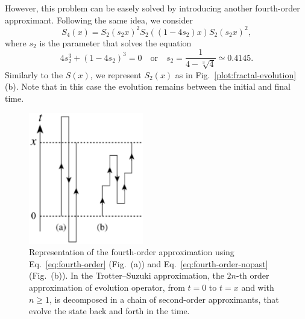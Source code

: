 However, this problem can be easely solved by introducing another fourth-order approximant. Following the same idea, we consider
\begin{equation} \label{eq:fourth-order-nopast}
S_4(x) = S_2(s_2x)^2 S_2((1-4s_2)x) S_2(s_2x)^2	,
\end{equation}
where $s_2$ is the parameter that solves the equation
\begin{equation}
4s_2^3 + (1-4s_2)^3 = 0 \quad \mathrm{or} \quad s_2 = \frac{1}{4 - \sqrt[3]{4}} \simeq 0.4145.
\end{equation}
Similarly to the $S(x)$, we represent $S_2(x)$ as in Fig.~\ref{plot:fractal-evolution}(b). Note that in this case the evolution remains between the initial and final time.
\begin{figure}[h!]
   \centering
   \includegraphics[width=5cm]{Plots/evolution.eps}
   \caption{Representation of the fourth-order approximation using Eq.~\eqref{eq:fourth-order} (Fig.~(a)) and Eq.~\eqref{eq:fourth-order-nopast} (Fig.~(b)). In the Trotter--Suzuki approximation, the $2n$-th order approximation of evolution operator, from $t=0$ to $t=x$ and with $n \geq 1 $, is decomposed in a chain of second-order approximants, that evolve the state back and forth in the time.} \label{plot:evolution}
\end{figure}


